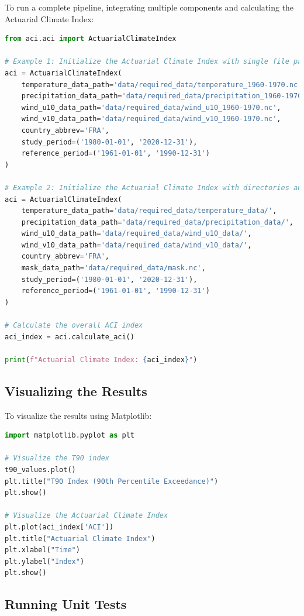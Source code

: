 \documentclass[a4paper,12pt]{article}
\begin{document}
To run a complete pipeline, integrating multiple components and calculating the Actuarial Climate Index:

\begin{lstlisting}[language=python]
from aci.aci import ActuarialClimateIndex

# Example 1: Initialize the Actuarial Climate Index with single file paths and no mask
aci = ActuarialClimateIndex(
    temperature_data_path='data/required_data/temperature_1960-1970.nc',
    precipitation_data_path='data/required_data/precipitation_1960-1970.nc',
    wind_u10_data_path='data/required_data/wind_u10_1960-1970.nc',
    wind_v10_data_path='data/required_data/wind_v10_1960-1970.nc',
    country_abbrev='FRA',
    study_period=('1980-01-01', '2020-12-31'),
    reference_period=('1961-01-01', '1990-12-31')
)

# Example 2: Initialize the Actuarial Climate Index with directories and an optional mask
aci = ActuarialClimateIndex(
    temperature_data_path='data/required_data/temperature_data/', 
    precipitation_data_path='data/required_data/precipitation_data/', 
    wind_u10_data_path='data/required_data/wind_u10_data/',
    wind_v10_data_path='data/required_data/wind_v10_data/',
    country_abbrev='FRA',
    mask_data_path='data/required_data/mask.nc',
    study_period=('1980-01-01', '2020-12-31'),
    reference_period=('1961-01-01', '1990-12-31')
)

# Calculate the overall ACI index
aci_index = aci.calculate_aci()

print(f"Actuarial Climate Index: {aci_index}")
\end{lstlisting}

\subsection{Visualizing the Results}

To visualize the results using Matplotlib:

\begin{lstlisting}[language=python]
import matplotlib.pyplot as plt

# Visualize the T90 index
t90_values.plot()
plt.title("T90 Index (90th Percentile Exceedance)")
plt.show()

# Visualize the Actuarial Climate Index
plt.plot(aci_index['ACI'])
plt.title("Actuarial Climate Index")
plt.xlabel("Time")
plt.ylabel("Index")
plt.show()
\end{lstlisting}

\subsection{Running Unit Tests}
\end{document}
